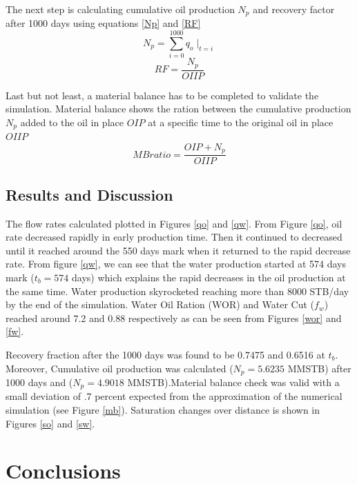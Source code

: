 \documentclass[12pt,letterpaper,titlepage]{article}
\begin{document}
The next step is calculating cumulative oil production $N_p$ and recovery factor after 1000 days using equations \ref{Np} and \ref{RF}
\begin{equation}
\label{Np}
N_p=\sum_{i=0}^{1000} q_{o}\mid_{t=i}
\end{equation}
\begin{equation}
\label{RF}
RF = \frac{N_p}{OIIP}
\end{equation}

Last but not least, a material balance has to be completed to validate the simulation. Material balance shows the ration between the cumulative production $N_p$ added to the oil in place $OIP$ at a specific time to the original oil in place $OIIP$
$$MBratio=\frac{OIP+N_p}{OIIP}$$

\subsection{Results and Discussion}
The flow rates calculated  plotted in Figures \ref{qo} and \ref{qw}. From Figure \ref{qo}, oil rate decreased rapidly in early production time. Then it continued to decreased until it reached around the 550 days mark when it returned to the rapid decrease rate. From figure \ref{qw}, we can see that the water production started at 574 days mark ($t_b=574$ days) which explains the rapid decreases in the oil production at the same time. Water production skyrocketed reaching more than 8000 STB/day by the end of the simulation. Water Oil Ration (WOR) and Water Cut ($f_w$) reached around 7.2 and 0.88 respectively as can be seen from Figures \ref{wor} and \ref{fw}. 

Recovery fraction after the 1000 days was found to be 0.7475 and 0.6516 at $t_b$. Moreover, Cumulative oil production was calculated ($N_p=5.6235$ MMSTB) after 1000 days and ($N_p=4.9018$ MMSTB).Material balance check was valid with a small deviation of .7 percent expected from the approximation of the numerical simulation (see Figure \ref{mb}). Saturation changes over distance is shown in Figures \ref{so} and \ref{sw}.







\section{Conclusions}
\end{document}
